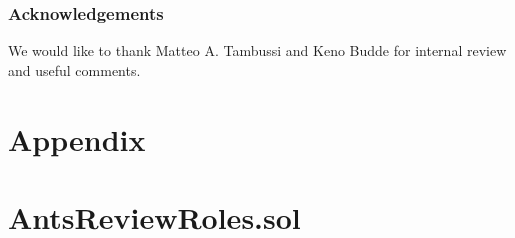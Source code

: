 \documentclass[runningheads]{llncs}
\begin{document}
\subsubsection{Acknowledgements} We would like to thank Matteo A. Tambussi and Keno Budde for internal review and useful comments.

\newpage

\section{Appendix}

\appendix

\section{AntsReviewRoles.sol}

\label{appendix:a}
\end{document}
